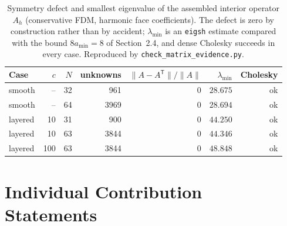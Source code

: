\documentclass[11pt,a4paper]{article}
\theoremstyle{definition}
\theoremstyle{remark}
\begin{document}
\begin{table}[H]
\centering\small
\caption{Symmetry defect and smallest eigenvalue of the assembled interior
operator $A_h$ (conservative FDM, harmonic face coefficients). The defect is
zero by construction rather than by accident; $\lambda_{\min}$ is an
\texttt{eigsh} estimate compared with the bound $8a_{\min}=8$ of
Section~2.4, and dense Cholesky succeeds in every case. Reproduced by
\texttt{check\_matrix\_evidence.py}.}
\label{tab:matrix_evidence}
\begin{tabular}{@{}lrrrrrr@{}}
\toprule
Case & $c$ & $N$ & unknowns & $\|A-A^{\mathsf T}\|/\|A\|$ & $\lambda_{\min}$ & Cholesky \\
\midrule
smooth  & -- & 32 & 961  & $0$ & $28.675$ & ok \\
smooth  & -- & 64 & 3969 & $0$ & $28.694$ & ok \\
layered & 10  & 31 & 900  & $0$ & $44.250$ & ok \\
layered & 10  & 63 & 3844 & $0$ & $44.346$ & ok \\
layered & 100 & 63 & 3844 & $0$ & $48.848$ & ok \\
\bottomrule
\end{tabular}
\end{table}

\newpage

\newpage

\clearpage

\clearpage





\clearpage
\def\reportbuild{}
\appendix

\clearpage
\begingroup\small

\endgroup
\clearpage


\clearpage
\section{Individual Contribution Statements}
\label{app:ics}
\begingroup\fontsize{10}{12}\selectfont

\endgroup
\clearpage
\begingroup\fontsize{10}{12}\selectfont

\endgroup
\clearpage
\begingroup\fontsize{10}{12}\selectfont

\endgroup
\clearpage
\begingroup\fontsize{10}{12}\selectfont

\endgroup

\clearpage
\begingroup\fontsize{10}{12}\selectfont

\endgroup
\clearpage
\end{document}
